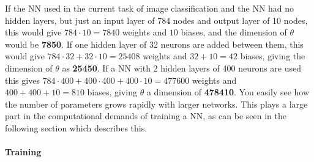 \documentclass{article}
\begin{document}
\noindent If the NN used in the current task of image classification and the NN had no hidden layers, but just an input layer of 784 nodes and output layer of 10 nodes, this would give $784\cdot10 = 7840$ weights and $10$ biases, and the dimension of $\theta$ would be \textbf{7850}. If one hidden layer of 32 neurons are added between them, this would give $784\cdot32 + 32\cdot10 = 25408$ weights and $32+10 =42$ biases, giving the dimension of $\theta$ as \textbf{25450}. If a NN with 2 hidden layers of 400 neurons are used this gives $784\cdot400 + 400\cdot400 + 400\cdot10 = 477600$ weights and $400+400+10=810$ biases, giving $\theta$ a dimension of \textbf{478410}. You easily see how the number of parameters grows rapidly with larger networks. This plays a large part in the computational demands of training a NN, as can be seen in the following section which describes this. 
\paragraph{Training}\label{Training}
\hfill \break
\end{document}
